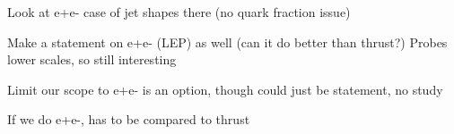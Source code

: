 


	Look at e+e- case of jet shapes there (no quark fraction issue)

	Make a statement on e+e- (LEP) as well (can it do better than thrust?)
		Probes lower scales, so still interesting

	Limit our scope to e+e- is an option, though could just be statement, no study

	If we do e+e-, has to be compared to thrust


